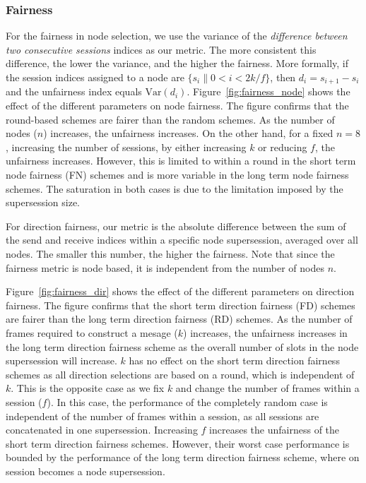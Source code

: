 \documentclass[10pt,letterpaper,conference]{IEEEtran}
\begin{document}
\subsubsection{Fairness}
For the fairness in node selection, we use the variance of the \emph{difference
between two consecutive sessions} indices as our metric. The more consistent
this difference, the lower the variance, and the higher the fairness. More
formally, if the session indices assigned to a node are $\{s_i\| 0<i< 2k/f\}$,
then $d_i= s_{i+1}- s_i$ and the unfairness index equals $\textrm{Var}(d_{i})$.
Figure~\ref{fig:fairness_node} shows the effect of the different parameters on
node fairness. The figure confirms that the round-based schemes are fairer than
the random schemes. As the number of nodes ($n$) increases, the unfairness
increases. On the other hand, for a fixed $n=8$, increasing the number of
sessions, by either increasing $k$ or reducing $f$, the unfairness increases.
However, this is limited to within a round in the short term node fairness (FN) schemes
and is more variable in the long term node fairness schemes. The saturation in both
cases is due to the limitation imposed by the supersession size.

For direction fairness, our metric is the absolute difference between the sum of
the send and receive indices within a specific node supersession, averaged over
all nodes. The smaller this number, the higher the fairness. Note that since the
fairness metric is node based, it is independent from the number of nodes $n$.

Figure~\ref{fig:fairness_dir} shows the effect of the different parameters on
direction fairness. The figure confirms that the short term direction fairness (FD) schemes are fairer
than the long term direction fairness (RD) schemes. As the number of frames required to construct a mesage  ($k$) increases, the
unfairness increases in the long term direction fairness scheme as the overall number of
slots in the node supersession will increase. $k$ has no effect on the short term direction fairness schemes as all direction selections are based on a round, which
is independent of $k$. This is the opposite case as we fix $k$ and change the
number of frames within a session ($f$). In this case, the performance of the
completely random case is independent of the number of frames within a session,
as all sessions are concatenated in one supersession. Increasing $f$ increases
the unfairness of the short term direction fairness schemes. However, their worst case
performance is bounded by the performance of the long term direction fairness scheme, where
on session becomes a node supersession.
\end{document}
